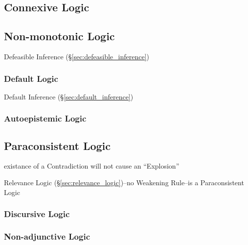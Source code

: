 \subsection{Connexive Logic}\label{sec:connexive_logic}

\subsection{Non-monotonic Logic}\label{sec:nonmonotonic_logic}

Defeasible Inference (\S\ref{sec:defeasible_inference})



\subsubsection{Default Logic}\label{sec:default_logic}

Default Inference (\S\ref{sec:default_inference})



\subsubsection{Autoepistemic Logic}\label{sec:autoepistemic_logic}



\subsection{Paraconsistent Logic}\label{sec:paraconsistent_logic}

existance of a Contradiction will not cause an ``Explosion''

Relevance Logic (\S\ref{sec:relevance_logic})--no Weakening Rule--is a
Paraconsistent Logic



\subsubsection{Discursive Logic}\label{sec:discursive_logic}

\subsubsection{Non-adjunctive Logic}\label{sec:nonadjunctive_logic}


